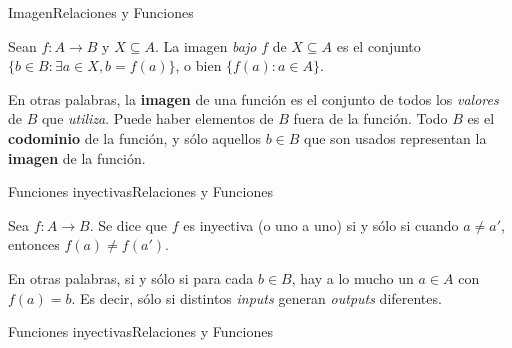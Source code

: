 \documentclass[spanish, c]{beamer}
\begin{document}
\begin{frame}{Imagen}{Relaciones y Funciones}
    \begin{definition}
        Sean $f : A \to B$ y $X \subseteq A$. La \alert{imagen} \textit{bajo} $f$ de $X \subseteq A$ es el conjunto $\{b \in B : \exists a \in X, b = f(a)\}$, o bien $\{f(a) : a \in A\}$.
    \end{definition} \pause
    \bigskip
    En otras palabras, la \textbf{imagen} de una función es el conjunto de todos los \textit{valores} de $B$ que \textit{utiliza}.
    \bigskip
    Puede haber elementos de $B$ fuera de la función. Todo $B$ es el \textbf{codominio} de la función, y sólo aquellos $b \in B$ que son usados representan la \textbf{imagen} de la función.
    
\end{frame}

\begin{frame}{Funciones inyectivas}{Relaciones y Funciones}
    \begin{definition}
        Sea $f : A \to B$. Se dice que $f$ es \alert{inyectiva} (o \alert{uno a uno}) si y sólo si cuando $a \neq a'$, entonces $f(a) \neq f(a')$.
    \end{definition} \pause
    \bigskip
    En otras palabras, si y sólo si para cada $b \in B$, hay a lo mucho un $a \in A$ con $f(a) = b$. Es decir, sólo si distintos \textit{inputs} generan \textit{outputs} diferentes.
\end{frame}

\begin{frame}{Funciones inyectivas}{Relaciones y Funciones}
    \begin{center}
    \end{center}
\end{frame}
\end{document}
